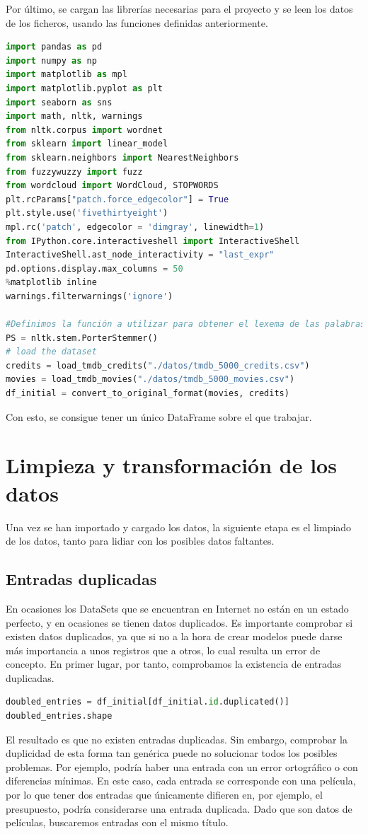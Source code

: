 Por último, se cargan las librerías necesarias para el proyecto y se leen los datos de los ficheros, usando las funciones definidas anteriormente.
\begin{lstlisting}[language=Python, caption=Código usado para la carga de los datos.]
import pandas as pd
import numpy as np
import matplotlib as mpl
import matplotlib.pyplot as plt
import seaborn as sns
import math, nltk, warnings
from nltk.corpus import wordnet
from sklearn import linear_model
from sklearn.neighbors import NearestNeighbors
from fuzzywuzzy import fuzz
from wordcloud import WordCloud, STOPWORDS
plt.rcParams["patch.force_edgecolor"] = True
plt.style.use('fivethirtyeight')
mpl.rc('patch', edgecolor = 'dimgray', linewidth=1)
from IPython.core.interactiveshell import InteractiveShell
InteractiveShell.ast_node_interactivity = "last_expr"
pd.options.display.max_columns = 50
%matplotlib inline
warnings.filterwarnings('ignore')

#Definimos la función a utilizar para obtener el lexema de las palabras.
PS = nltk.stem.PorterStemmer()
# load the dataset
credits = load_tmdb_credits("./datos/tmdb_5000_credits.csv")
movies = load_tmdb_movies("./datos/tmdb_5000_movies.csv")
df_initial = convert_to_original_format(movies, credits)
\end{lstlisting}

Con esto, se consigue tener un único DataFrame sobre el que trabajar.

\section{Limpieza y transformación de los datos}

Una vez se han importado y cargado los datos, la siguiente etapa es el limpiado de los datos, tanto para lidiar con los posibles datos faltantes.

\subsection{Entradas duplicadas}

En ocasiones los DataSets que se encuentran en Internet no están en un estado perfecto, y en ocasiones se tienen datos duplicados. Es importante comprobar si existen datos duplicados, ya que si no a la hora de crear modelos puede darse más importancia a unos registros que a otros, lo cual resulta un error de concepto. En primer lugar, por tanto, comprobamos la existencia de entradas duplicadas.
\begin{lstlisting}[language=Python, caption=Entradas duplicadas]
doubled_entries = df_initial[df_initial.id.duplicated()]
doubled_entries.shape
\end{lstlisting}
El resultado es que no existen entradas duplicadas. Sin embargo, comprobar la duplicidad de esta forma tan genérica puede no solucionar todos los posibles problemas. Por ejemplo, podría haber una entrada con un error ortográfico o con diferencias mínimas. En este caso, cada entrada se corresponde con una película, por lo que tener dos entradas que únicamente difieren en, por ejemplo, el presupuesto, podría considerarse una entrada duplicada. Dado que son datos de películas, buscaremos entradas con el mismo título. 

